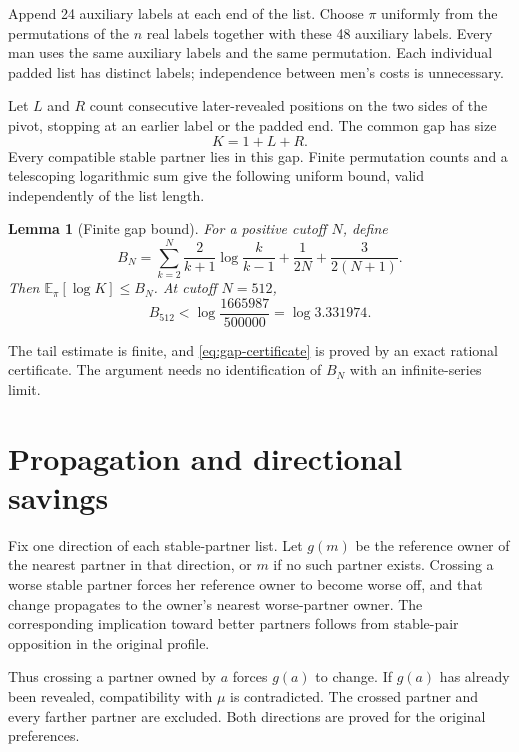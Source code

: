 \documentclass[11pt,letterpaper]{article}
\newtheorem{lemma}{Lemma}
\theoremstyle{remark}
\newcommand{\E}{\mathbb{E}}
\numberwithin{equation}{section}
\begin{document}
Append 24 auxiliary labels at each end of the list. Choose \(\pi\)
uniformly from the permutations of the \(n\) real labels together with
these 48 auxiliary labels. Every man uses the same auxiliary labels
and the same permutation. Each individual padded list has distinct
labels; independence between men's costs is unnecessary.

Let \(L\) and \(R\) count consecutive later-revealed positions on the
two sides of the pivot, stopping at an earlier label or the padded end.
The common gap has size
\begin{equation}\label{eq:gap}
  K=1+L+R.
\end{equation}
Every compatible stable partner lies in this gap. Finite permutation
counts and a telescoping logarithmic sum give the following uniform
bound, valid independently of the list length.

\begin{lemma}[Finite gap bound]\label{lem:gap}
For a positive cutoff \(N\), define
\begin{equation}\label{eq:BN}
  B_N = \sum_{k=2}^{N} \frac{2}{k+1}\log\frac{k}{k-1}
        +\frac{1}{2N}+\frac{3}{2(N+1)}.
\end{equation}
Then \(\E_\pi[\log K]\le B_N\). At cutoff \(N=512\),
\begin{equation}\label{eq:gap-certificate}
  B_{512}<\log\frac{1665987}{500000}=\log 3.331974.
\end{equation}
\end{lemma}

The tail estimate is finite, and \eqref{eq:gap-certificate} is proved
by an exact rational certificate. The argument needs no identification
of \(B_N\) with an infinite-series limit.

\section{Propagation and directional savings}
\label{sec:directional}

Fix one direction of each stable-partner list. Let \(g(m)\) be the
reference owner of the nearest partner in that direction, or \(m\)
if no such partner exists. Crossing a worse stable partner forces her
reference owner to become worse off, and that change propagates to the
owner's nearest worse-partner owner. The corresponding implication
toward better partners follows from stable-pair opposition in the
original profile.

Thus crossing a partner owned by \(a\) forces \(g(a)\) to change.
If \(g(a)\) has already been revealed, compatibility with \(\mu\)
is contradicted. The crossed partner and every farther partner are
excluded. Both directions are proved for the original preferences.
\end{document}
